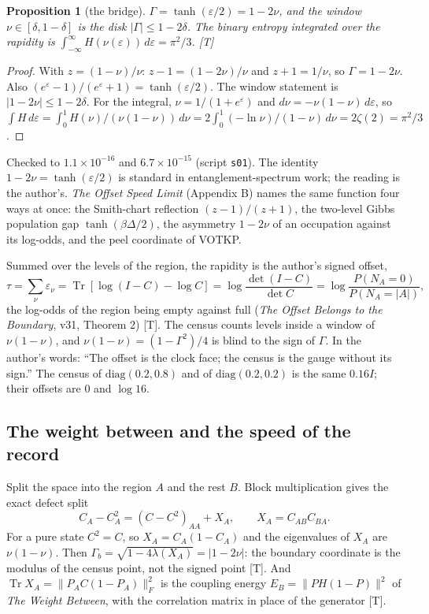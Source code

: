\documentclass[11pt]{article}
\newtheorem{proposition}[theorem]{Proposition}
\theoremstyle{definition}
\newcommand{\grade}[1]{\textsf{\small[#1]}}
\newcommand{\Tr}{\operatorname{Tr}}
\begin{document}
\begin{proposition}[the bridge] \label{prop:bridge}
$\Gamma=\tanh(\varepsilon/2)=1-2\nu$, and the window $\nu\in[\delta,1-\delta]$ is the disk $|\Gamma|\le1-2\delta$. The binary entropy integrated over the rapidity is $\int_{-\infty}^{\infty}H(\nu(\varepsilon))\,d\varepsilon=\pi^2/3$. \grade{T}
\end{proposition}
\begin{proof}
With $z=(1-\nu)/\nu$: $z-1=(1-2\nu)/\nu$ and $z+1=1/\nu$, so $\Gamma=1-2\nu$. Also $(e^\varepsilon-1)/(e^\varepsilon+1)=\tanh(\varepsilon/2)$. The window statement is $|1-2\nu|\le1-2\delta$. For the integral, $\nu=1/(1+e^\varepsilon)$ and $d\nu=-\nu(1-\nu)\,d\varepsilon$, so $\int H\,d\varepsilon=\int_0^1 H(\nu)/(\nu(1-\nu))\,d\nu=2\int_0^1(-\ln\nu)/(1-\nu)\,d\nu=2\zeta(2)=\pi^2/3$.
\end{proof}
Checked to $1.1\times10^{-16}$ and $6.7\times10^{-15}$ (script \texttt{s01}). The identity $1-2\nu=\tanh(\varepsilon/2)$ is standard in entanglement-spectrum work; the reading is the author's. \emph{The Offset Speed Limit} (Appendix B) names the same function four ways at once: the Smith-chart reflection $(z-1)/(z+1)$, the two-level Gibbs population gap $\tanh(\beta\Delta/2)$, the asymmetry $1-2\nu$ of an occupation against its log-odds, and the peel coordinate of VOTKP.

Summed over the levels of the region, the rapidity is the author's signed offset,
\begin{equation}
\tau=\sum_\nu \varepsilon_\nu=\Tr[\log(I-C)-\log C]=\log\frac{\det(I-C)}{\det C}=\log\frac{P(N_A=0)}{P(N_A=|A|)},
\end{equation}
the log-odds of the region being empty against full (\emph{The Offset Belongs to the Boundary}, v31, Theorem 2) \grade{T}. The census counts levels inside a window of $\nu(1-\nu)$, and $\nu(1-\nu)=(1-\Gamma^2)/4$ is blind to the sign of $\Gamma$. In the author's words: ``The offset is the clock face; the census is the gauge without its sign.'' The census of $\mathrm{diag}(0.2,0.8)$ and of $\mathrm{diag}(0.2,0.2)$ is the same $0.16I$; their offsets are $0$ and $\log16$.

\subsection{The weight between and the speed of the record}
Split the space into the region $A$ and the rest $B$. Block multiplication gives the exact defect split
\begin{equation}
C_A-C_A^2=(C-C^2)_{AA}+X_A,\qquad X_A=C_{AB}C_{BA}.
\label{eq:split}
\end{equation}
For a pure state $C^2=C$, so $X_A=C_A(1-C_A)$ and the eigenvalues of $X_A$ are $\nu(1-\nu)$. Then $\Gamma_b=\sqrt{1-4\lambda(X_A)}=|1-2\nu|$: the boundary coordinate is the modulus of the census point, not the signed point \grade{T}. And $\Tr X_A=\|P_AC(1-P_A)\|_F^2$ is the coupling energy $E_B=\|PH(1-P)\|^2$ of \emph{The Weight Between}, with the correlation matrix in place of the generator \grade{T}.
\end{document}

